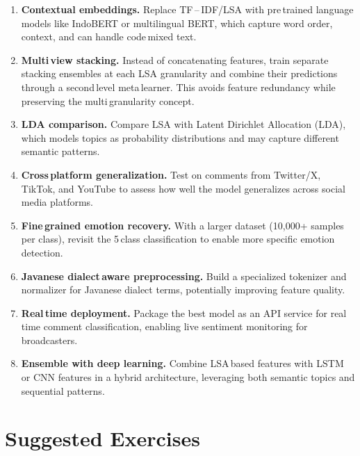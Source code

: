 \documentclass[12pt,a4paper,twoside]{article}
\theoremstyle{definition}
\begin{document}
\begin{enumerate}[leftmargin=2em]
    \item \textbf{Contextual embeddings.} Replace TF\,--\,IDF/LSA with pre\,trained language models like IndoBERT \citep{wongso2024nusabert} or multilingual BERT, which capture word order, context, and can handle code\,mixed text.

    \item \textbf{Multi\,view stacking.} Instead of concatenating features, train separate stacking ensembles at each LSA granularity and combine their predictions through a second\,level meta\,learner. This avoids feature redundancy while preserving the multi\,granularity concept.

    \item \textbf{LDA comparison.} Compare LSA with Latent Dirichlet Allocation (LDA), which models topics as probability distributions and may capture different semantic patterns.

    \item \textbf{Cross\,platform generalization.} Test on comments from Twitter/X, TikTok, and YouTube to assess how well the model generalizes across social media platforms.

    \item \textbf{Fine\,grained emotion recovery.} With a larger dataset (10{,}000+ samples per class), revisit the 5\,class classification to enable more specific emotion detection.

    \item \textbf{Javanese dialect\,aware preprocessing.} Build a specialized tokenizer and normalizer for Javanese dialect terms, potentially improving feature quality.

    \item \textbf{Real\,time deployment.} Package the best model as an API service for real\,time comment classification, enabling live sentiment monitoring for broadcasters.

    \item \textbf{Ensemble with deep learning.} Combine LSA\,based features with LSTM or CNN features in a hybrid architecture, leveraging both semantic topics and sequential patterns.
\end{enumerate}

\section{Suggested Exercises}
\label{sec:exercises}
\end{document}
